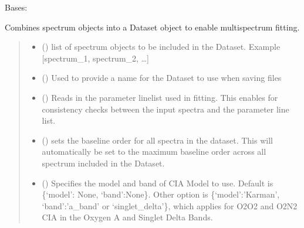 \documentclass[letterpaper,10pt,english]{sphinxmanual}
\begin{document}
\begin{fulllineitems}
\label{\detokenize{MATS:MATS.dataset.Dataset}}
\pysigstartsignatures
{}
\pysigstopsignatures
\sphinxAtStartPar
Bases: 

\sphinxAtStartPar
Combines spectrum objects into a Dataset object to enable multi\sphinxhyphen{}spectrum fitting.
\begin{quote}\begin{description}
\begin{itemize}
\item {} 
\sphinxAtStartPar
{} () \textendash{} list of spectrum objects to be included in the Dataset. Example {[}spectrum\_1, spectrum\_2, …{]}

\item {} 
\sphinxAtStartPar
{} () \textendash{} Used to provide a name for the Dataset to use when saving files

\item {} 
\sphinxAtStartPar
{} () \textendash{} Reads in the  parameter linelist used in fitting.  This enables for consistency checks between the input spectra and the parameter line list.

\item {} 
\sphinxAtStartPar
{} () \textendash{} sets the baseline order for all spectra in the dataset.  This will automatically be set to the maximum baseline order across all spectrum included in the Dataset.

\item {} 
\sphinxAtStartPar
{} () \textendash{} Specifies the model and band of CIA Model to use.  Default is \{‘model’: None, ‘band’:None\}.  Other option is \{‘model’:’Karman’, ‘band’:’a\_band’ or ‘singlet\_delta’\}, which applies for O2\sphinxhyphen{}O2 and O2\sphinxhyphen{}N2 CIA in the Oxygen A and Singlet Delta Bands.


\end{itemize}
\end{description}
\end{quote}
\end{fulllineitems}
\end{document}
